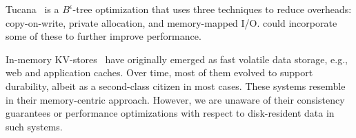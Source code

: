 Tucana~\cite{tucana} is a $B^{\epsilon}$-tree optimization that uses three techniques to reduce overheads: copy-on-write, 
private allocation, and memory-mapped I/O. \sys\/ could incorporate some of these to further improve performance. 

In-memory KV-stores~\cite{ignite, redis, memcached, Srinivasan:2016:AAR:3007263.3007276} have originally emerged as fast volatile 
data storage, e.g., web and application caches. Over time, most of them evolved to support durability,
albeit as a second-class citizen in most cases. 
These systems resemble \sys\/ in their memory-centric approach. 
However, we are unaware of their consistency guarantees or performance optimizations with respect  to disk-resident data in such systems. 

